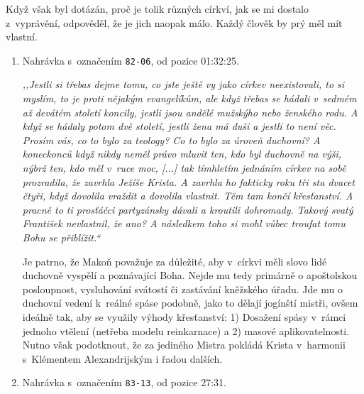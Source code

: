 Když však byl dotázán, proč je tolik různých církví, jak se mi dostalo
z~vyprávění, odpověděl, že je jich naopak málo. Každý člověk by prý měl mít
vlastní.

\begin{enumerate}

\item{
Nahrávka s~označením \texttt{82-06}, od pozice 01:32:25.

\textit{%
,,Jestli si třebas dejme tomu, co jste ještě vy jako církev neexistovali, to si
myslím, to je proti nějakým evangelíkům, ale když třebas se hádali v~sedmém až
devátém století koncily, jestli jsou andělé mužskýho nebo ženského rodu. A když
se hádaly potom dvě století, jestli žena má duši a jestli to není věc. Prosím
vás, co to bylo za teology? Co to bylo za úroveň duchovní? A koneckonců když
nikdy neměl právo mluvit ten, kdo byl duchovně na výši, nýbrž ten, kdo měl
v~ruce moc, [...] tak tímhletím jednáním církev na sobě prozradila,
že zavrhla Ježíše Krista. A zavrhla ho fakticky roku tři sta dvacet čtyři, když
dovolila vraždit a dovolila vlastnit. Těm tam končí křesťanství. A pracně to ti
prosťáčci partyzánsky dávali a kroutili dohromady. Takový svatý František
nevlastnil, že ano? A následkem toho si mohl vůbec troufat tomu Bohu se
přiblížit.``
}

Je patrno, že Makoň považuje za důležité, aby v~církvi měli slovo lidé duchovně
vyspělí a poznávající Boha. Nejde mu tedy primárně o apoštolskou posloupnost,
vysluhování svátostí či zastávání kněžského úřadu. Jde mu o duchovní vedení
        k~reálné spáse podobně, jako to dělají jogínští mistři, ovšem ideálně
        tak, aby se využily výhody křesťanství: 1) Dosažení spásy v~rámci jednoho
        vtělení (netřeba modelu reinkarnace) a 2) masové aplikovatelnosti. Nutno
        však podotknout, že za jediného Mistra pokládá Krista v~harmonii
        s~Klémentem Alexandrijským\cite{klement2019vychovatel} i řadou dalších.

}

\item{
Nahrávka s~označením \texttt{83-13}, od pozice 27:31.

}
\end{enumerate}

